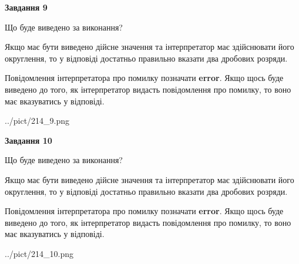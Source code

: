 \documentclass[12pt, ukrainian]{article}
\begin{document}
{\begin {Large}
{\begin {center}\textbf{Завдання 9}\end {center}}\par
Що буде виведено за виконання? \par

Якщо має бути виведено дійсне значення та інтерпретатор має здійснювати його округлення, 
то у відповіді достатньо правильно вказати два дробових розряди.

Повідомлення інтерпретатора про помилку позначати \textbf{error}.
Якщо щось буде виведено до того, як інтерпретатор видасть повідомлення про помилку, 
то воно має вказуватись у відповіді. \par

\begin{center}
	{../pict/214_9.png}
\end{center}
\newpage

{\begin {center}\textbf{Завдання 10}\end {center}}\par
Що буде виведено за виконання? \par

Якщо має бути виведено дійсне значення та інтерпретатор має здійснювати його округлення, 
то у відповіді достатньо правильно вказати два дробових розряди.

Повідомлення інтерпретатора про помилку позначати \textbf{error}.
Якщо щось буде виведено до того, як інтерпретатор видасть повідомлення про помилку, 
то воно має вказуватись у відповіді. \par

\begin{center}
	{../pict/214_10.png}
\end{center}
\newpage

\end {Large}}
\end{document}
